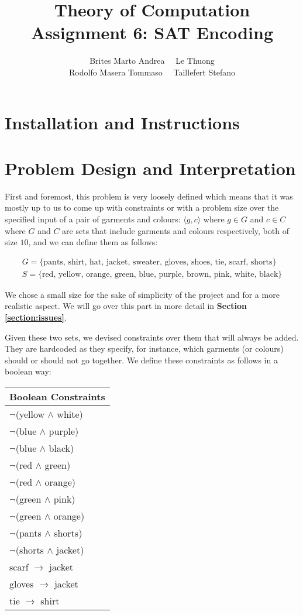 \documentclass[12pt]{article}
\title{Theory of Computation \\ Assignment 6: SAT Encoding}
\author{Brites Marto Andrea \ \ Le Thuong \\ Rodolfo Masera Tommaso \ \ Taillefert Stefano}
\date{}
\newcommand{\mygather}[1]{\begin{gather*} #1 \end{gather*}}
\begin{document}
\maketitle

\section{Installation and Instructions}


\section{Problem Design and Interpretation}\label{section:design}

    First and foremost, this problem is very loosely defined which means that it was mostly up to us to come up with constraints or with a problem size over the specified input of a pair of garments and colours: $\langle g, c \rangle$ where $g \in G$ and $c \in C$ where $G$ and $C$ are sets that include garments and colours respectively, both of size $10$, and we can define them as follows:

    \mygather{
        G = \{\text{pants, shirt, hat, jacket, sweater, gloves, shoes, tie, scarf, shorts} \} \\
        S = \{\text{red, yellow, orange, green, blue, purple, brown, pink, white, black} \}
    }

    We chose a small size for the sake of simplicity of the project and for a more realistic aspect. We will go over this part in more detail in \textbf{Section \ref{section:issues}}.

    Given these two sets, we devised constraints over them that will always be added. They are hardcoded as they specify, for instance, which garments (or colours) should or should not go together.
    We define these constraints as follows in a boolean way:

    \begin{center}
    \begin{tabular}{|l|}
    \hline
    Boolean Constraints \\
    \hline
    $\neg$(yellow $\wedge$ white) \\[0.1cm]
    $\neg$(blue $\wedge$ purple) \\[0.1cm]
    $\neg$(blue $\wedge$ black) \\[0.1cm]
    $\neg$(red $\wedge$ green) \\[0.1cm]
    $\neg$(red $\wedge$ orange) \\[0.1cm]
    $\neg$(green $\wedge$ pink) \\[0.1cm]
    $\neg$(green $\wedge$ orange) \\[0.1cm]
    $\neg$(pants $\wedge$ shorts) \\[0.1cm]
    $\neg$(shorts $\wedge$ jacket) \\[0.1cm]
    scarf $\rightarrow$ jacket \\[0.1cm]
    gloves $\rightarrow$ jacket \\[0.1cm]
    tie $\rightarrow$ shirt \\
    \hline
    \end{tabular}
    \end{center}
\end{document}
